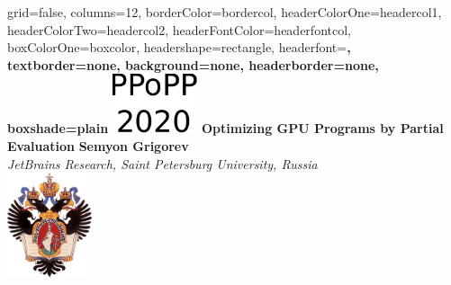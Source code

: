 \documentclass[a0paper,portrait]{baposter}
\begin{document}
\setlength{\fboxsep}{0pt}


\begin{poster}{
grid=false,
columns=12, %
borderColor=bordercol, %
headerColorOne=headercol1, %
headerColorTwo=headercol2, %
headerFontColor=headerfontcol, %
boxColorOne=boxcolor, %
headershape=rectangle, %
headerfont=\Large\sf\bf, %
textborder=none,
background=none,
headerborder=none, %
boxshade=plain
}
{\includegraphics[width=2.5cm]{figures/PPoPP.pdf}}
%
%
{\bf \huge{Optimizing GPU Programs by Partial Evaluation} }
{\vspace{0.6em} \smaller \textbf{Semyon Grigorev} \\  %
\smaller \it {JetBrains Research, Saint Petersburg University, Russia } \\ %
}
{\includegraphics[width=2.5cm]{SPbGU_Logo.png}} %


\end{poster}
\end{document}
